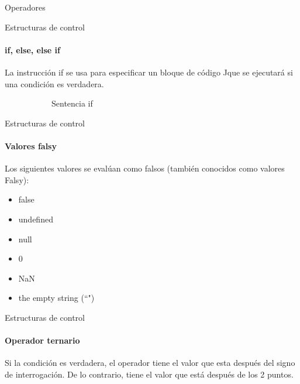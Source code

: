 \documentclass[aspectratio=169]{beamer}
\begin{document}
\begin{darkframes}
\begin{frame}{Operadores}
    \end{frame}


    \begin{frame}{Estructuras de control}
      \framesubtitle{if, else, else if}
      La instrucción if se usa para especificar un bloque de código Jque se ejecutará si una condición es verdadera.
      \begin{figure}[H]
        \begin{subfigure}{.7\textwidth}
          \begin{block}{Sentencia if}
            \sentif
          \end{block}
        \end{subfigure}
      \end{figure}
    \end{frame}

    \begin{frame}{Estructuras de control}
      \framesubtitle{Valores \alert{falsy}}
      Los siguientes valores se evalúan como falsos (también conocidos como valores Falsy):
      \begin{itemize}
        \item false
        \item undefined
        \item null
        \item 0
        \item NaN
        \item the empty string (``")
      \end{itemize}

    \end{frame}


    \begin{frame}{Estructuras de control}
      \framesubtitle{Operador ternario}
      Si la condición es verdadera, el operador tiene el valor que esta después del signo de interrogación. De lo contrario, tiene el valor que está después de los 2 puntos.


\end{frame}
\end{darkframes}
\end{document}
